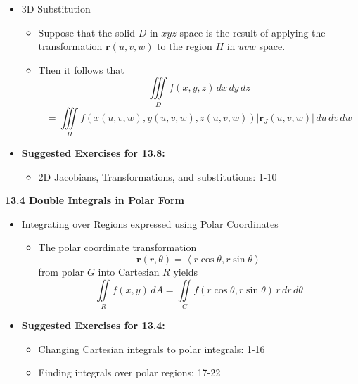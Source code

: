 \documentclass[12pt]{article}
\renewcommand{\vec}[1]{\mathbf{#1}}
\newcommand{\dvar}[1]{\,d{#1}}
\newcommand{\<}{\left<}
\renewcommand{\>}{\right>}
\begin{document}
\begin{itemize}
  \newpage
    
  \item 3D Substitution
  
    \begin{itemize}
    \item Suppose that the solid $D$ in $xyz$ space is the result of applying the transformation $\vec{r}(u,v,w)$ to the region $H$ in $uvw$ space.
    \item Then it follows that \[\iiint\limits_D f(x,y,z)\,dx\,dy\,dz \]\[= \iiint\limits_H f(x(u,v,w),y(u,v,w),z(u,v,w))|\vec{r}_J(u,v,w)|\,du\,dv\,dw\]
    \end{itemize}
        
  \item \textbf{Suggested Exercises for 13.8:}
  
    \begin{itemize}
    \item 2D Jacobians, Transformations, and substitutions: 1-10
    \end{itemize}
    
  \end{itemize}
  
  \newpage
  
  \centerline{\bf 13.4 Double Integrals in Polar Form}
  
  \begin{itemize}
  
  \item Integrating over Regions expressed using Polar Coordinates
    
    \begin{itemize}
    \item The polar coordinate transformation \[\vec{r}(r,\theta) = \<r\cos\theta, r\sin\theta\>\] from polar $G$ into Cartesian $R$ yields \[\iint\limits_R f(x,y)\, dA = \iint\limits_G f(r\cos\theta,r\sin\theta)\,r\dvar{r}\dvar{\theta}\]
    \end{itemize}
      
  \item \textbf{Suggested Exercises for 13.4:}
  
    \begin{itemize}
    \item Changing Cartesian integrals to polar integrals: 1-16
    \item Finding integrals over polar regions: 17-22
    \end{itemize}
    
  \end{itemize}
  
\end{document}
